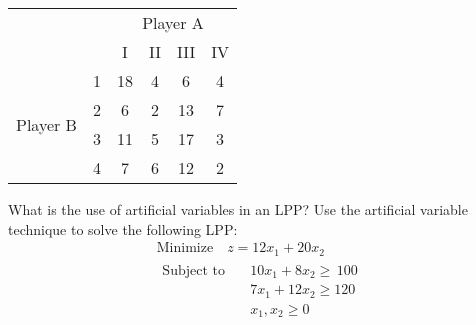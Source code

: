\begin{table}[!htbp]
\centering
\begin{tabular}{*{6}{c}}
& & \multicolumn{4}{c}{Player A} \\
& & I & II & III & IV \\
\multicolumn{1}{c}{\multirow{4}{*}{Player B}} &
1 & 18 & 4 & 6 & 4\\
&2 & 6 & 2 & 13 & 7\\
&3 & 11 & 5 & 17 & 3\\
&4 & 7 & 6 & 12 & 2\\
\end{tabular} 
\end{table}
\myline
{} What is the use of artificial variables in an LPP? Use the artificial variable technique to solve the following LPP:
\begin{gather*}
    \text{Minimize} \quad z = 12x_1 + 20 x_2 \\
    \begin{aligned}
        \text{Subject to} \quad  &10x_1 + 8x_2  \geq \, 100 \\
         &7x_1 + 12x_2 \geq 120 \\
            &x_1,x_2\geq 0
    \end{aligned}
\end{gather*}